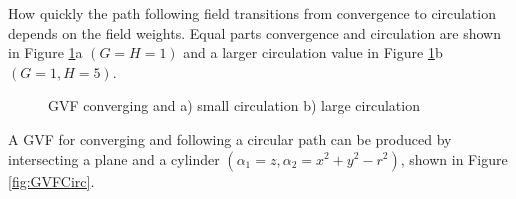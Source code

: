 \documentclass[numbered,pdftex]{ohio-etd}
\begin{document}
How quickly the path following field transitions from convergence to circulation depends on the field weights. Equal parts convergence and circulation are shown in Figure \ref{fig:GVFLine}a $(G=H=1)$ and a larger circulation value in Figure \ref{fig:GVFLine}b $(G=1, H=5)$.


\begin{figure}[H]
	\begin{subfigmatrix}{2}%
		\centering	
		
		\hspace*{0mm}
	\end{subfigmatrix}
	\caption{GVF converging and a) small circulation b) large circulation}
	\label{fig:GVFLine}
\end{figure} 

A GVF for converging and following a circular path can be produced by intersecting a plane and a cylinder $(\alpha_1 = z,\alpha_2 = x^2+y^2-r^2)$, shown in Figure \ref{fig:GVFCirc}.
\end{document}

